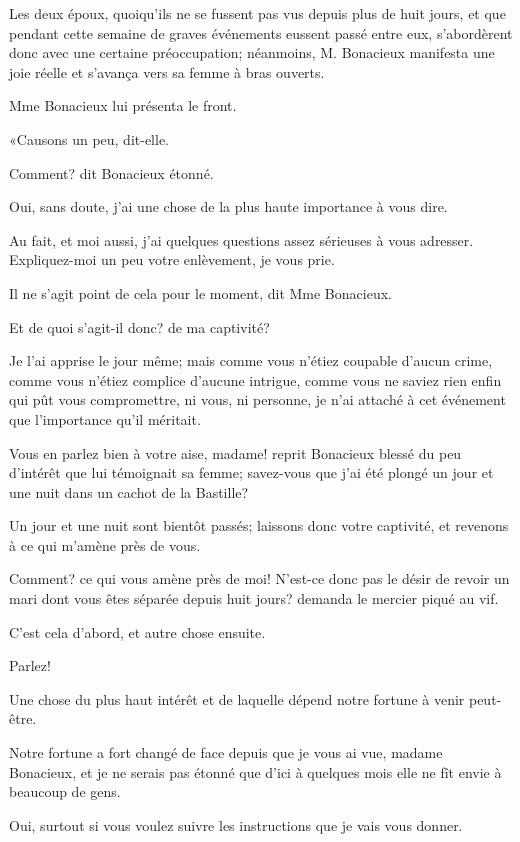 Les deux époux, quoiqu'ils ne se fussent pas vus depuis plus de huit jours, et que pendant cette semaine de graves événements eussent passé entre eux, s'abordèrent donc avec une certaine préoccupation; néanmoins, M. Bonacieux manifesta une joie réelle et s'avança vers sa femme à bras ouverts. 

Mme Bonacieux lui présenta le front. 

«Causons un peu, dit-elle. 

\speak  Comment? dit Bonacieux étonné. 

\speak  Oui, sans doute, j'ai une chose de la plus haute importance à vous dire. 

\speak  Au fait, et moi aussi, j'ai quelques questions assez sérieuses à vous adresser. Expliquez-moi un peu votre enlèvement, je vous prie. 

\speak  Il ne s'agit point de cela pour le moment, dit Mme Bonacieux. 

\speak  Et de quoi s'agit-il donc? de ma captivité? 

\speak  Je l'ai apprise le jour même; mais comme vous n'étiez coupable d'aucun crime, comme vous n'étiez complice d'aucune intrigue, comme vous ne saviez rien enfin qui pût vous compromettre, ni vous, ni personne, je n'ai attaché à cet événement que l'importance qu'il méritait. 

\speak  Vous en parlez bien à votre aise, madame! reprit Bonacieux blessé du peu d'intérêt que lui témoignait sa femme; savez-vous que j'ai été plongé un jour et une nuit dans un cachot de la Bastille? 

\speak  Un jour et une nuit sont bientôt passés; laissons donc votre captivité, et revenons à ce qui m'amène près de vous. 

\speak  Comment? ce qui vous amène près de moi! N'est-ce donc pas le désir de revoir un mari dont vous êtes séparée depuis huit jours? demanda le mercier piqué au vif. 

\speak  C'est cela d'abord, et autre chose ensuite. 

\speak  Parlez! 

\speak  Une chose du plus haut intérêt et de laquelle dépend notre fortune à venir peut-être. 

\speak  Notre fortune a fort changé de face depuis que je vous ai vue, madame Bonacieux, et je ne serais pas étonné que d'ici à quelques mois elle ne fît envie à beaucoup de gens. 

\speak  Oui, surtout si vous voulez suivre les instructions que je vais vous donner. 

